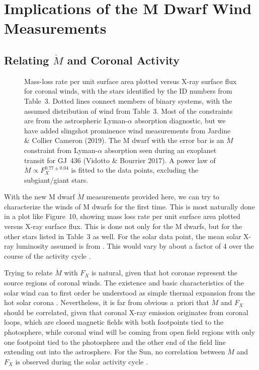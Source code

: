 \documentclass[preprint]{aastex}
\begin{document}
\section{Implications of the M Dwarf Wind Measurements}

\subsection{Relating $\dot{M}$ and Coronal Activity}

\begin{figure}[t]
\caption{Mass-loss rate per unit surface area plotted versus X-ray surface
  flux for coronal winds, with the stars identified by the ID numbers from
  Table~3.  Dotted lines connect members of binary systems, with the assumed
  distribution of wind from Table~3.  Most of the constraints are from the
  astrospheric Lyman-$\alpha$ absorption diagnostic, but we have added
  slingshot prominence wind measurements from
  Jardine \& Collier Cameron (2019).  The M dwarf with
  the error bar is an $\dot{M}$ constraint from Lyman-$\alpha$ absorption
  seen during an exoplanet transit for GJ~436 (Vidotto \& Bourrier 2017).
  A power law of $\dot{M}\propto F_X^{0.77\pm 0.04}$ is fitted to the data
  points, excluding the subgiant/giant stars.}
\end{figure}
     With the new M dwarf $\dot{M}$ measurements provided here, we can
try to characterize the winds of M dwarfs for the first time.  This is
most naturally done in a plot like Figure~10, showing mass loss rate
per unit surface area plotted versus X-ray surface flux.  This is done not
only for the M dwarfs, but for the other stars listed in Table~3 as well.
For the solar data point, the mean solar X-ray luminosity assumed is from
\citet{pgj03}.  This would vary by about a factor of 4
over the course of the activity cycle \citep{tra20}.

     Trying to relate $\dot{M}$ with $F_X$ is natural, given that hot
coronae represent the source regions of coronal winds.  The existence
and basic characteristics of the solar wind can to first order be
understood as simple thermal expansion from the hot solar corona
\citep{enp58}.  Nevertheless, it is far from obvious a~priori that
$\dot{M}$ and $F_X$ should be correlated, given that coronal X-ray
emission originates from coronal loops, which are closed magnetic
fields with both footpoints tied to the photosphere, while coronal
wind will be coming from open field regions with only one footpoint
tied to the photosphere and the other end of the field line extending
out into the astrosphere.  For the Sun, no correlation
between $\dot{M}$ and $F_X$ is observed during the solar activity
cycle \citep{oc11}.
\end{document}
